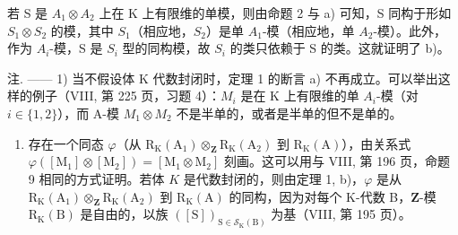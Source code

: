若 S 是 \(A_{1} \otimes A_{2}\) 上在 K 上有限维的单模，则由命题 2 与 a) 可知，S 同构于形如 \(S_{1} \otimes S_{2}\) 的模，其中 \(S_{1}\)（相应地，\(S_{2}\)）是单 \(A_{1}\)-模（相应地，单 \(A_{2}\)-模）。此外，作为 \(A_{i}\)-模，S 是 \(S_{i}\) 型的同构模，故 \(S_{i}\) 的类只依赖于 S 的类。这就证明了 b)。

注. —— 1) 当不假设体 K 代数封闭时，定理 1 的断言 a) 不再成立。可以举出这样的例子（VIII, 第 225 页，习题 4）：\(M_{i}\) 是在 K 上有限维的单 \(A_{i}\)-模（对 \(i \in \{1, 2\}\)），而 A-模 \(M_{1} \otimes M_{2}\) 不是半单的，或者是半单的但不是单的。

\begin{enumerate}
\def\labelenumi{\arabic{enumi})}
\setcounter{enumi}{1}
\tightlist
\item
  存在一个同态 \(\varphi\)（从 \(\mathrm{R_K(A_1)\otimes_{\mathbf{Z}} R_K(A_2)}\) 到 \(\mathrm{R_K(A)}\)），由关系式 \(\varphi ([\mathrm{M}_1]\otimes [\mathrm{M}_2]) = [\mathrm{M}_1\otimes \mathrm{M}_2]\) 刻画。这可以用与 VIII, 第 196 页，命题 9 相同的方式证明。若体 \(K\) 是代数封闭的，则由定理 1, b)，\(\varphi\) 是从 \(\mathrm{R_K(A_1)\otimes_{\mathbf{Z}} R_K(A_2)}\) 到 \(\mathrm{R_K(A)}\) 的同构，因为对每个 K-代数 B，\(\mathbf{Z}\)-模 \(\mathrm{R_K(B)}\) 是自由的，以族 \(([\mathrm{S}])_{\mathrm{S}\in \mathcal{S}_{\mathrm{K}}(\mathrm{B})}\) 为基（VIII, 第 195 页）。
\end{enumerate}

